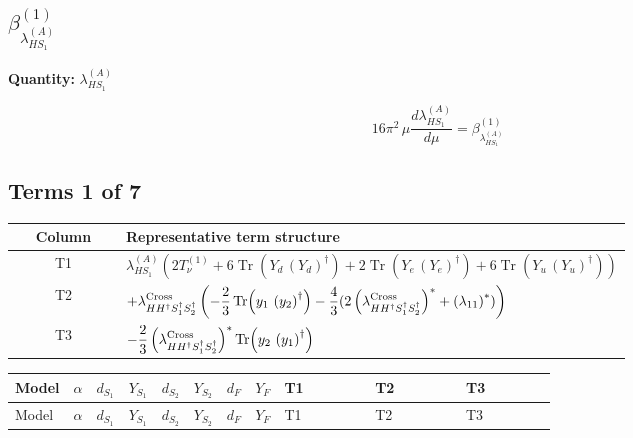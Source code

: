 \documentclass[8pt]{article}
\begin{document}
\begin{landscape}
\section*{$\beta_{\lambda_{HS_1}^{(A)}}^{(1)}$}
\noindent\textbf{Quantity: }$\lambda_{HS_1}^{(A)}$\par\smallskip
\[16\pi^2\,\mu\frac{d \lambda_{HS_1}^{(A)}}{d\mu}=\beta_{\lambda_{HS_1}^{(A)}}^{(1)}\]
\subsection*{Terms 1 of 7}
\begin{center}
\begin{tabular}{@{}c >{\raggedright\arraybackslash}p{0.82\linewidth}@{}}
\toprule
Column & Representative term structure \\
\midrule
T1 & \(\displaystyle {\lambda_{HS_1}^{(A)}} (2 T_{\nu}^{(1)}+6 \operatorname{Tr}\!\left({Y_d}\,\left({Y_d}\right)^{\dagger}\right)+2 \operatorname{Tr}\!\left({Y_e}\,\left({Y_e}\right)^{\dagger}\right)+6 \operatorname{Tr}\!\left({Y_u}\,\left({Y_u}\right)^{\dagger}\right))\) \\
\midrule
T2 & \(\displaystyle +{\lambda_{H H^\dagger S_1^\dagger S_2^\dagger}^{\rm Cross}} \left(-\frac{2}{3} \operatorname{Tr}\!\left({y_1}\,\left({y_2}\right)^{\dagger}\right)-\frac{4}{3} (2 \left({\lambda_{H H^\dagger S_1^\dagger S_2^\dagger}^{\rm Cross}}\right)^{*}+\left({\lambda_{11}}\right)^{*})\right)\) \\
\midrule
T3 & \(\displaystyle -\frac{2}{3} \left({\lambda_{H H^\dagger S_1^\dagger S_2^\dagger}^{\rm Cross}}\right)^{*} \operatorname{Tr}\!\left({y_2}\,\left({y_1}\right)^{\dagger}\right)\) \\
\midrule
\bottomrule
\end{tabular}
\end{center}
\smallskip
\tiny
\begin{longtable}{@{}llcccccc >{\raggedright\arraybackslash}p{0.21\linewidth} >{\raggedright\arraybackslash}p{0.21\linewidth} >{\raggedright\arraybackslash}p{0.21\linewidth}@{}}
\toprule
Model & $\alpha$ & $d_{S_1}$ & $Y_{S_1}$ & $d_{S_2}$ & $Y_{S_2}$ & $d_F$ & $Y_F$ & T1 & T2 & T3 \\
\midrule
\endfirsthead
\toprule
Model & $\alpha$ & $d_{S_1}$ & $Y_{S_1}$ & $d_{S_2}$ & $Y_{S_2}$ & $d_F$ & $Y_F$ & T1 & T2 & T3 \\
\midrule
\endhead

\end{longtable}
\end{landscape}
\end{document}
